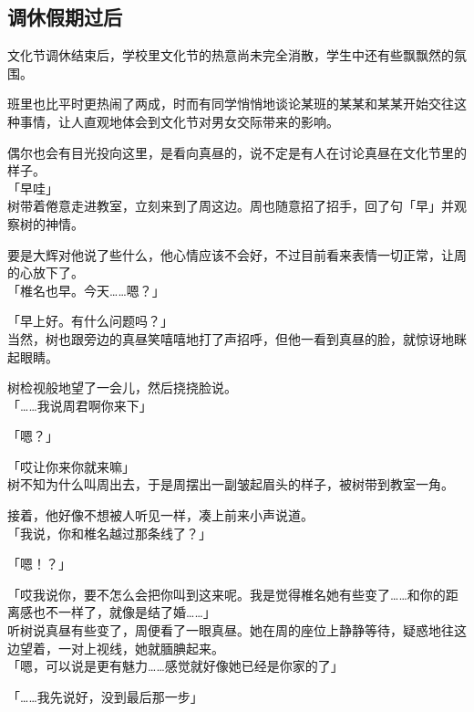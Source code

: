 \subsection{调休假期过后}

文化节调休结束后，学校里文化节的热意尚未完全消散，学生中还有些飘飘然的氛围。

班里也比平时更热闹了两成，时而有同学悄悄地谈论某班的某某和某某开始交往这种事情，让人直观地体会到文化节对男女交际带来的影响。

偶尔也会有目光投向这里，是看向真昼的，说不定是有人在讨论真昼在文化节里的样子。\\

「早哇」\\

树带着倦意走进教室，立刻来到了周这边。周也随意招了招手，回了句「早」并观察树的神情。

要是大辉对他说了些什么，他心情应该不会好，不过目前看来表情一切正常，让周的心放下了。\\

「椎名也早。今天……嗯？」

「早上好。有什么问题吗？」\\

当然，树也跟旁边的真昼笑嘻嘻地打了声招呼，但他一看到真昼的脸，就惊讶地眯起眼睛。

树检视般地望了一会儿，然后挠挠脸说。\\

「……我说周君啊你来下」

「嗯？」

「哎让你来你就来嘛」\\

树不知为什么叫周出去，于是周摆出一副皱起眉头的样子，被树带到教室一角。

接着，他好像不想被人听见一样，凑上前来小声说道。\\

「我说，你和椎名越过那条线了？」

「嗯！？」

「哎我说你，要不怎么会把你叫到这来呢。我是觉得椎名她有些变了……和你的距离感也不一样了，就像是结了婚……」\\

听树说真昼有些变了，周便看了一眼真昼。她在周的座位上静静等待，疑惑地往这边望着，一对上视线，她就腼腆起来。\\

「嗯，可以说是更有魅力……感觉就好像她已经是你家的了」

「……我先说好，没到最后那一步」


